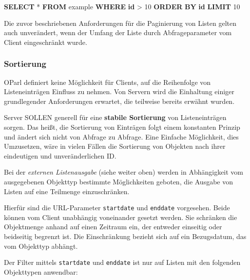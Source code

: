 \documentclass[,a4paper]{article}
\newenvironment{Shaded}{}{}
\newcommand{\KeywordTok}[1]{\textcolor[rgb]{0.00,0.44,0.13}{\textbf{{#1}}}}
\newcommand{\DecValTok}[1]{\textcolor[rgb]{0.25,0.63,0.44}{{#1}}}
\newcommand{\NormalTok}[1]{{#1}}
\begin{document}
\begin{Shaded}
\begin{Highlighting}[]
\KeywordTok{SELECT} \NormalTok{* }\KeywordTok{FROM} \NormalTok{example }\KeywordTok{WHERE} \KeywordTok{id} \NormalTok{> }\DecValTok{10} \KeywordTok{ORDER} \KeywordTok{BY} \KeywordTok{id} \KeywordTok{LIMIT} \DecValTok{10}
\end{Highlighting}
\end{Shaded}

Die zuvor beschriebenen Anforderungen für die Paginierung von Listen
gelten auch unverändert, wenn der Umfang der Liste durch
Abfrageparameter vom Client eingeschränkt wurde.

\subsubsection{Sortierung}\label{sortierung}

OParl definiert keine Möglichkeit für Clients, auf die Reihenfolge von
Listeneinträgen Einfluss zu nehmen. Von Servern wird die Einhaltung
einiger grundlegender Anforderungen erwartet, die teilweise bereits
erwähnt wurden.

Server SOLLEN generell für eine \textbf{stabile Sortierung} von
Listeneinträgen sorgen. Das heißt, die Sortierung von Einträgen folgt
einem konstanten Prinzip und ändert sich nicht von Abfrage zu Abfrage.
Eine Einfache Möglichkeit, dies Umzusetzen, wäre in vielen Fällen die
Sortierung von Objekten nach ihrer eindeutigen und unveränderlichen ID.


Bei der \emph{externen Listenausgabe} (siehe weiter oben) werden in
Abhängigkeit vom ausgegebenen Objekttyp bestimmte Möglichkeiten geboten,
die Ausgabe von Listen auf eine Teilmenge einzuschränken.

Hierfür sind die URL-Parameter \texttt{startdate} und \texttt{enddate}
vorgesehen. Beide können vom Client unabhängig voneinander gesetzt
werden. Sie schränken die Objektmenge anhand auf einen Zeitraum ein, der
entweder einseitig oder beidseitig begrenzt ist. Die Einschränkung
bezieht sich auf ein Bezugsdatum, das vom Objekttyp abhängt.

Der Filter mittels \texttt{startdate} und \texttt{enddate} ist nur auf
Listen mit den folgenden Objekttypen anwendbar:
\end{document}
